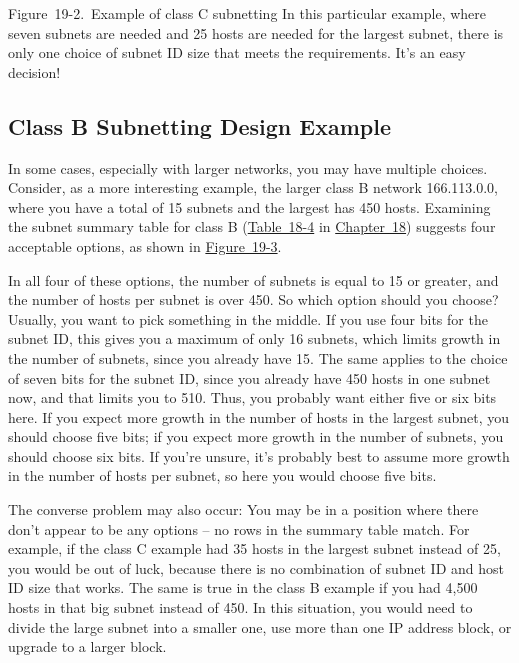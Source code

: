 \documentclass[b5paper,11pt]{memoir}
\begin{document}
\protect\hypertarget{ch19s02.htmlux5cux23example_of_class_c_subnetting_in_this_pa}{}{}

\protect\hypertarget{ch19s02.htmlux5cux23I_mediaobject5_d1e20669}{}{}

Figure~19-2.~Example of class C subnetting In this particular example,
where seven subnets are needed and 25 hosts are needed for the largest
subnet, there is only one choice of subnet ID size that meets the
requirements. It's an easy decision!

\subsection[class B Subnetting Design
Example]{\texorpdfstring{\protect\hypertarget{ch19s02.htmlux5cux23class_b_subnetting_design_example}{}{}Class
B Subnetting Design Example}{class B Subnetting Design Example}}

In some cases, especially with larger networks, you may have multiple
choices. Consider, as a more interesting
\protect\hypertarget{ch19s02.htmlux5cux23idx-CHP-19-0749}{}{}example,
the larger class B network 166.113.0.0, where you have a total of 15
subnets and the largest has 450 hosts. Examining the subnet summary
table for class B
(\protect\hyperlink{ch18s07.htmlux5cux23subnetting_summary_table_for_class_b_net}{Table~18-4}
in \protect\hyperlink{ch18.html}{Chapter~18}) suggests four acceptable
options, as shown in
\protect\hyperlink{ch19s02.htmlux5cux23example_of_class_b_subnetting_this_class}{Figure~19-3}.

In all four of these options, the number of subnets is equal to 15 or
greater, and the number of hosts per subnet is over 450. So which option
should you choose? Usually, you want to pick something in the middle. If
you use four bits for the subnet ID, this gives you a maximum of only 16
subnets, which limits growth in the number of subnets, since you already
have 15. The same applies to the choice of seven bits for the subnet ID,
since you already have 450 hosts in one subnet now, and that limits you
to 510. Thus, you probably want either five or six bits here. If you
expect more growth in the number of hosts in the largest subnet, you
should choose five bits; if you expect more growth in the number of
subnets, you should choose six bits. If you're unsure, it's probably
best to assume more growth in the number of hosts per subnet, so here
you would choose five bits.

The converse problem may also occur: You may be in a position where
there don't appear to be any options -- no rows in the summary table
match. For example, if the class C example had 35 hosts in the largest
subnet instead of 25, you would be out of luck, because there is no
combination of subnet ID and host ID size that works. The same is true
in the class B example if you had 4,500 hosts in that big subnet instead
of 450. In this situation, you would need to divide the large subnet
into a smaller one, use more than one IP address block, or upgrade to a
larger block.
\end{document}
